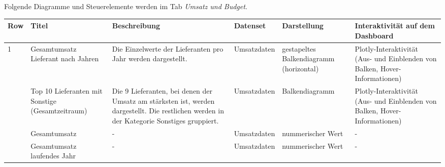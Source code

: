     Folgende Diagramme und Steuerelemente werden im Tab \textit{Umsatz und Budget}.
    \begingroup
    \setlength{\tabcolsep}{12pt} %
    \begin{table}[h]
        \LARGE
        \centering
        \begin{adjustbox}{max width=\textwidth}
        \begin{tabular}{p{}p{}p{}p{}p{}p{}}
           \toprule
           Row        &Titel &Beschreibung &Datenset &Darstellung &Interaktivität auf dem Dashboard\\
           \midrule
            1           &Gesamtumsatz Lieferant nach Jahren &Die Einzelwerte der Lieferanten pro Jahr werden dargestellt.   &Umsatzdaten    &gestapeltes Balkendiagramm (horizontal)    &Plotly-Interaktivität (Aus- und Einblenden von Balken, Hover-Informationen)\\
                        &Top 10 Lieferanten mit Sonstige (Gesamtzeitraum)   &Die 9 Lieferanten, bei denen der Umsatz am stärksten ist, werden dargestellt. Die restlichen werden in der Kategorie Sonstiges gruppiert.   &Umsatzdaten    &Balkendiagramm    &Plotly-Interaktivität (Aus- und Einblenden von Balken, Hover-Informationen)\\
                        &Gesamtumsatz&-&Umsatzdaten    &nummerischer Wert   &-\\
                        &Gesamtumsatz laufendes Jahr&-&Umsatzdaten    &nummerischer Wert   &-\\
            

\end{tabular}
\end{adjustbox}
\end{table}
